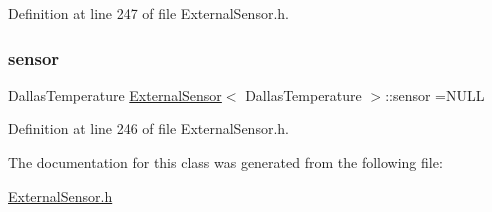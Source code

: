 Definition at line 247 of file External\+Sensor.\+h.

\mbox{\label{classExternalSensor_3_01DallasTemperature_01_4_adb6ba4fcdedef95ad8f6b0c9b6c0f9d1}} 
\subsubsection{\texorpdfstring{sensor}{sensor}}
{\footnotesize\ttfamily Dallas\+Temperature \hyperlink{classExternalSensor}{External\+Sensor}$<$ Dallas\+Temperature $>$\+::sensor =N\+U\+LL\hspace{0.3cm}{\ttfamily [private]}}



Definition at line 246 of file External\+Sensor.\+h.



The documentation for this class was generated from the following file\+:\begin{DoxyCompactItemize}
\item 
\hyperlink{ExternalSensor_8h}{External\+Sensor.\+h}\end{DoxyCompactItemize}
